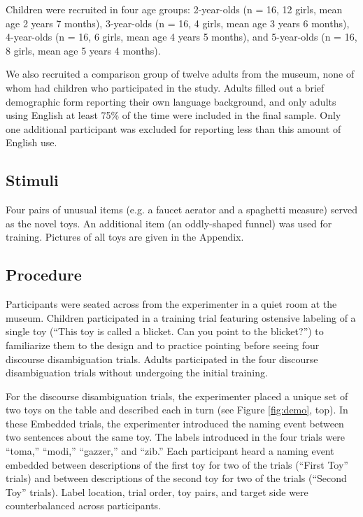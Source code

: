\documentclass[man]{apa2}
\begin{document}
Children were recruited in four age groups: 2-year-olds (n = 16, 12 girls, mean age 2 years 7 months), 3-year-olds (n = 16, 4 girls, mean age 3 years 6 months), 4-year-olds (n = 16, 6 girls, mean age 4 years 5 months), and 5-year-olds (n = 16, 8 girls, mean age 5 years 4 months).  

We also recruited a comparison group of twelve adults from the museum, none of whom had children who participated in the study. Adults filled out a brief demographic form reporting their own language background, and only adults using English at least 75\% of the time were included in the final sample. Only one additional participant was excluded for reporting less than this amount of English use.  


\subsection{Stimuli}

Four pairs of unusual items (e.g. a faucet aerator and a spaghetti measure) served as the novel toys.  An additional item (an oddly-shaped funnel) was used for training. Pictures of all toys are given in the Appendix.

\subsection{Procedure}

Participants were seated across from the experimenter in a quiet room at the museum.  Children participated in a training trial featuring ostensive labeling of a single toy (``This toy is called a blicket.  Can you point to the blicket?'') to familiarize them to the design and to practice pointing before seeing four discourse disambiguation trials.  Adults participated in the four discourse disambiguation trials without undergoing the initial training. 

For the discourse disambiguation trials, the experimenter placed a unique set of two toys on the table and described each in turn (see Figure \ref{fig:demo}, top).  In these Embedded trials, the experimenter introduced the naming event between two sentences about the same toy.  The labels introduced in the four trials were ``toma,'' ``modi,'' ``gazzer,'' and ``zib.''  Each participant heard a naming event embedded between descriptions of the first toy for two of the trials (``First Toy'' trials) and between descriptions of the second toy for two of the trials (``Second Toy'' trials).  Label location, trial order, toy pairs, and target side were counterbalanced across participants.  
\end{document}
